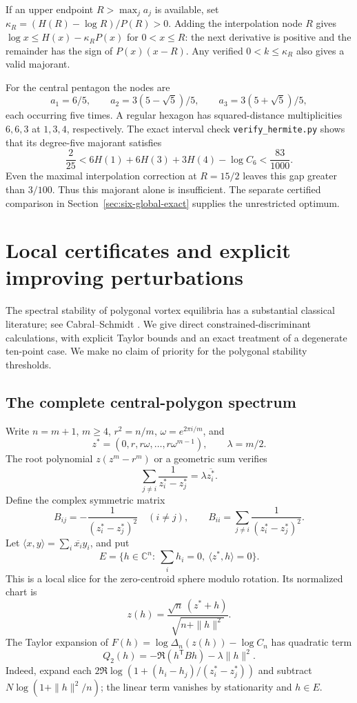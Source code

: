 \documentclass[11pt]{article}
\theoremstyle{remark}
\newcommand{\C}{\mathbb C}
\numberwithin{equation}{section}
\begin{document}
If an upper endpoint $R>\max_j a_j$ is available, set
$\kappa_R=(H(R)-\log R)/P(R)>0$.
Adding the interpolation node $R$ gives
$\log x\le H(x)-\kappa_RP(x)$ for $0<x\le R$:
the next derivative is positive and the remainder has the sign of
$P(x)(x-R)$. Any verified $0<k\le\kappa_R$ also gives a valid majorant.

For the central pentagon the nodes are
\[
 a_1=6/5,\qquad
 a_2=3(5-\sqrt5)/5,\qquad a_3=3(5+\sqrt5)/5,
\]
each occurring five times.
A regular hexagon has squared-distance multiplicities $6,6,3$ at
$1,3,4$, respectively. The exact interval check
\texttt{verify\_hermite.py} shows that its degree-five majorant satisfies
\[
 \frac2{25}<6H(1)+6H(3)+3H(4)-\log C_6<\frac{83}{1000}.
\]
Even the maximal interpolation correction at $R=15/2$ leaves
this gap greater than $3/100$.
Thus this majorant alone is insufficient. The separate certified
comparison in Section~\ref{sec:six-global-exact} supplies the
unrestricted optimum.

\section{Local certificates and explicit improving perturbations}
\label{sec:local-certificates}
The spectral stability of polygonal vortex equilibria has a substantial
classical literature; see Cabral--Schmidt \cite{CS}.
We give direct constrained-discriminant calculations, with explicit
Taylor bounds and an exact treatment of a degenerate ten-point case.
We make no claim of priority for the polygonal stability thresholds.

\subsection{The complete central-polygon spectrum}
Write $n=m+1$, $m\ge4$, $r^2=n/m$, $\omega=e^{2\pi i/m}$, and
\[
 z^*=(0,r,r\omega,\ldots,r\omega^{m-1}),\qquad \lambda=m/2.
\]
The root polynomial $z(z^m-r^m)$ or a geometric sum verifies
\[
 \sum_{j\ne i}\frac1{z_i^*-z_j^*}=\lambda\overline{z_i^*}.
\]
Define the complex symmetric matrix
\[
 B_{ij}=-\frac1{(z_i^*-z_j^*)^2}\quad(i\ne j),\qquad
 B_{ii}=\sum_{j\ne i}\frac1{(z_i^*-z_j^*)^2}.
\]
Let $\langle x,y\rangle=\sum_i\overline{x_i}y_i$, and put
\[
 E=\{h\in\C^n:\ \sum_i h_i=0,\ \langle z^*,h\rangle=0\}.
\]
This is a local slice for the zero-centroid sphere modulo rotation.
Its normalized chart is
\begin{equation}\label{eq:local-chart}
 z(h)=\frac{\sqrt n\,(z^*+h)}{\sqrt{n+\|h\|^2}}.
\end{equation}
The Taylor expansion of
$F(h)=\log\Delta_n(z(h))-\log C_n$ has quadratic term
\begin{equation}\label{eq:quadratic-slice}
 Q_2(h)=-\Re(h^{\mathsf T}Bh)-\lambda\|h\|^2.
\end{equation}
Indeed, expand each $2\Re\log(1+(h_i-h_j)/(z_i^*-z_j^*))$
and subtract $N\log(1+\|h\|^2/n)$; the linear term vanishes
by stationarity and $h\in E$.
\end{document}
